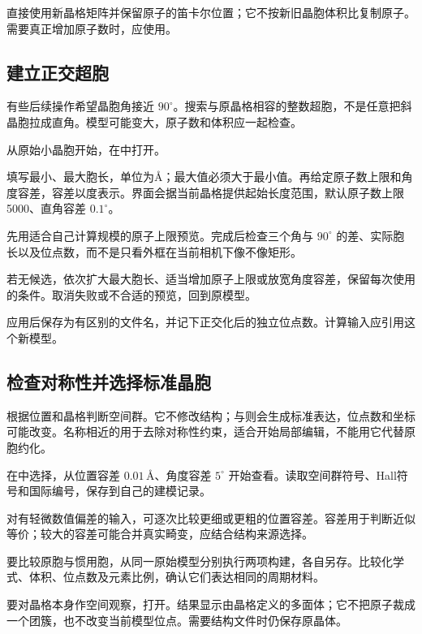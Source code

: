 直接使用新晶格矩阵并保留原子的笛卡尔位置；它不按新旧晶胞体积比复制原子。需要真正增加原子数时，应使用。



\subsection{建立正交超胞}\label{sec:orthogonal-cell-reference}

有些后续操作希望晶胞角接近 $90^\circ$。搜索与原晶格相容的整数超胞，不是任意把斜晶胞拉成直角。模型可能变大，原子数和体积应一起检查。

\begin{steps}
  \item 从原始小晶胞开始，在中打开。
  \item 填写最小、最大胞长，单位为\AA；最大值必须大于最小值。再给定原子数上限和角度容差，容差以度表示。界面会据当前晶格提供起始长度范围，默认原子数上限5000、直角容差 $0.1^\circ$。
  \item 先用适合自己计算规模的原子上限预览。完成后检查三个角与 $90^\circ$ 的差、实际胞长以及位点数，而不是只看外框在当前相机下像不像矩形。
  \item 若无候选，依次扩大最大胞长、适当增加原子上限或放宽角度容差，保留每次使用的条件。取消失败或不合适的预览，回到原模型。
  \item 应用后保存为有区别的文件名，并记下正交化后的独立位点数。计算输入应引用这个新模型。
\end{steps}

\subsection{检查对称性并选择标准晶胞}\label{sec:symmetry-reference}

根据位置和晶格判断空间群。它不修改结构；与则会生成标准表达，位点数和坐标可能改变。名称相近的用于去除对称性约束，适合开始局部编辑，不能用它代替原胞约化。

\begin{steps}
  \item 在中选择，从位置容差 $0.01\,\text{\AA}$、角度容差 $5^\circ$ 开始查看。读取空间群符号、Hall符号和国际编号，保存到自己的建模记录。
  \item 对有轻微数值偏差的输入，可逐次比较更细或更粗的位置容差。容差用于判断近似等价；较大的容差可能合并真实畸变，应结合结构来源选择。
  \item 要比较原胞与惯用胞，从同一原始模型分别执行两项构建，各自另存。比较化学式、体积、位点数及元素比例，确认它们表达相同的周期材料。
  \item 要对晶格本身作空间观察，打开。结果显示由晶格定义的多面体；它不把原子裁成一个团簇，也不改变当前模型位点。需要结构文件时仍保存原晶体。
\end{steps}

